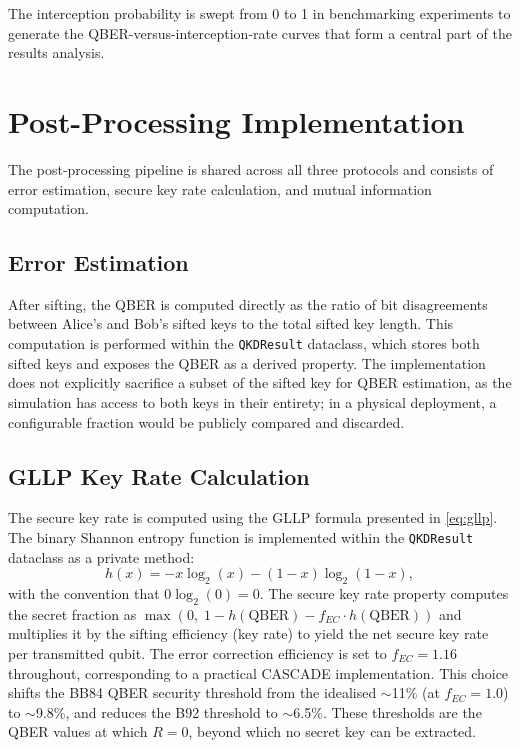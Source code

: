 The interception probability is swept from 0 to 1 in benchmarking experiments to generate the QBER-versus-interception-rate curves that form a central part of the results analysis.


\section{Post-Processing Implementation}

The post-processing pipeline is shared across all three protocols and consists of error estimation, secure key rate calculation, and mutual information computation.

\subsection{Error Estimation}

After sifting, the QBER is computed directly as the ratio of bit disagreements between Alice's and Bob's sifted keys to the total sifted key length. This computation is performed within the \texttt{QKDResult} dataclass, which stores both sifted keys and exposes the QBER as a derived property. The implementation does not explicitly sacrifice a subset of the sifted key for QBER estimation, as the simulation has access to both keys in their entirety; in a physical deployment, a configurable fraction would be publicly compared and discarded.

\subsection{GLLP Key Rate Calculation}

The secure key rate is computed using the GLLP formula presented in \cref{eq:gllp}. The binary Shannon entropy function is implemented within the \texttt{QKDResult} dataclass as a private method:
%
\begin{equation}
\label{eq:binary-entropy}
h(x) = -x \log_2(x) - (1 - x) \log_2(1 - x),
\end{equation}
%
with the convention that $0 \log_2(0) = 0$. The secure key rate property computes the secret fraction as $\max(0,\; 1 - h(\text{QBER}) - f_{EC} \cdot h(\text{QBER}))$ and multiplies it by the sifting efficiency (key rate) to yield the net secure key rate per transmitted qubit. The error correction efficiency is set to $f_{EC} = 1.16$ throughout, corresponding to a practical CASCADE implementation. This choice shifts the BB84 QBER security threshold from the idealised $\sim$11\% (at $f_{EC} = 1.0$) to $\sim$9.8\%, and reduces the B92 threshold to $\sim$6.5\%. These thresholds are the QBER values at which $R = 0$, beyond which no secret key can be extracted.

